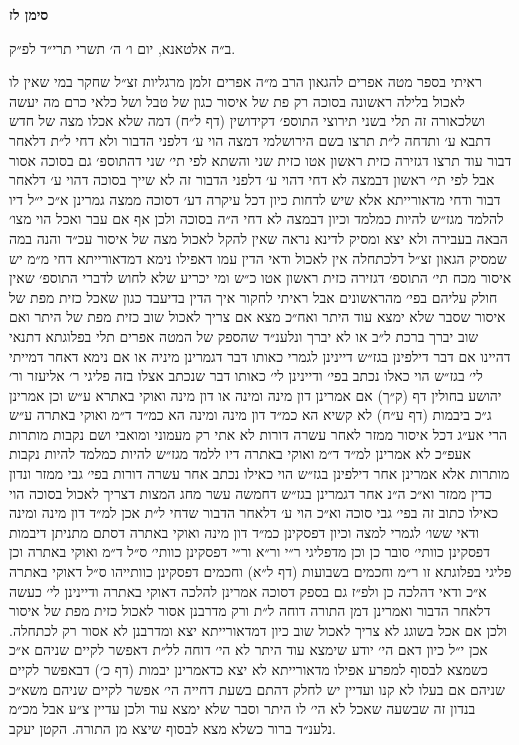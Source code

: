 \documentclass[12pt, openany]{book}
\newcommand{\chapname}{}
\newcommand{\newchap}[1]{
	\addcontentsline{toc}{chapter}{#1}
	\renewcommand{\chapname}{#1}
		\begin{center}
			\textbf{%
\fontsize{16pt}{16pt}\selectfont
				#1}
		\end{center}
}
\begin{document}
\newchap{סימן לז}
\begin{multicols}{2}
ב״ה אלטאנא, יום ו׳ ה׳ תשרי תרי״ד לפ״ק.\\\vspace{0pt}

ראיתי בספר מטה אפרים להגאון הרב מ״ה אפרים זלמן מרגליות זצ״ל שחקר במי שאין לו לאכול בלילה ראשונה בסוכה רק פת של איסור כגון של טבל ושל כלאי כרם מה יעשה ושלכאורה זה תלי בשני תירוצי התוספ׳ דקידושין (דף ל״ח) דמה שלא אכלו מצה של חדש דתבא ע׳ ותדחה ל״ת תרצו בשם הירושלמי דמצה הוי ע׳ דלפני הדבור ולא דחי ל״ת דלאחר דבור עוד תרצו דגזירה כזית ראשון אטו כזית שני והשתא לפי תי׳ שני דהתוספ׳ גם בסוכה אסור אבל לפי תי׳ ראשון דבמצה לא דחי דהוי ע׳ דלפני הדבור זה לא שייך בסוכה דהוי ע׳ דלאחר דבור ודחי מדאורייתא אלא שיש לדחות כיון דכל עיקרה דע׳ דסוכה ממצה גמרינן א״כ י״ל דיו להלמד מגז״ש להיות כמלמד וכיון דבמצה לא דחי ה״ה בסוכה ולכן אף אם עבר ואכל הוי מצו׳ הבאה בעבירה ולא יצא ומסיק לדינא נראה שאין להקל לאכול מצה של איסור עכ״ד והנה במה שמסיק הגאון זצ״ל דלכתחלה אין לאכול ודאי הדין עמו דאפילו נימא דמדאורייתא דחי מ״מ יש איסור מכח תי׳ התוספ׳ דגזירה כזית ראשון אטו כ״ש ומי יכריע שלא לחוש לדברי התוספ׳ שאין חולק עליהם בפי׳ מהראשונים אבל ראיתי לחקור איך הדין בדיעבד כגון שאכל כזית מפת של איסור שסבר שלא ימצא עוד היתר ואח״כ מצא אם צריך לאכול שוב כזית מפת של היתר ואם שוב יברך ברכת ל״ב או לא יברך ונלענ״ד שהספק של המטה אפרים תלי בפלוגתא דתנאי דהיינו אם דבר דילפינן בגז״ש דיינינן לגמרי כאותו דבר דגמרינן מיניה או אם נימא דאחר דמייתי לי׳ בגז״ש הוי כאלו נכתב בפי׳ ודיינינן לי׳ כאותו דבר שנכתב אצלו בזה פליגי ר׳ אליעזר ור׳ יהושע בחולין דף (ק״ך) אם אמרינן דון מינה ומינה או דון מינה ואוקי באתרא ע״ש וכן אמרינן ג״כ ביבמות (דף ע״ח) לא קשיא הא כמ״ד דון מינה ומינה הא כמ״ד ד״מ ואוקי באתרה ע״ש הרי אע״ג דכל איסור ממזר לאחר עשרה דורות לא אתי רק מעמוני ומואבי ושם נקבות מותרות אעפ״כ לא אמרינן למ״ד ד״מ ואוקי באתרה דיו ללמד מגז״ש להיות כמלמד להיות נקבות מותרות אלא אמרינן אחר דילפינן בגז״ש הוי כאילו נכתב אחר עשרה דורות בפי׳ גבי ממזר ונדון כדין ממזר וא״כ ה״נ אחר דגמרינן בגז״ש דחמשה עשר מחג המצות דצריך לאכול בסוכה הוי כאילו כתוב זה בפי׳ גבי סוכה וא״כ הוי ע׳ דלאחר הדבור שדחי ל״ת אכן למ״ד דון מינה ומינה ודאי ששו׳ לגמרי למצה וכיון דפסקינן כמ״ד דון מינה ואוקי באתרה דסתם מתניתן דיבמות דפסקינן כוותי׳ סובר כן וכן מדפליגי ר״י ור״א ור״י דפסקינן כוותי׳ ס״ל ד״מ ואוקי באתרה וכן פליגי בפלוגתא זו ר״מ וחכמים בשבועות (דף ל״א) וחכמים דפסקינן כוותייהו ס״ל דאוקי באתרה א״כ ודאי דהלכה כן ולפ״ז גם בספק דסוכה אמרינן להלכה דאוקי באתרה ודיינינן לי׳ כעשה דלאחר הדבור ואמרינן דמן התורה דוחה ל״ת ורק מדרבנן אסור לאכול כזית מפת של איסור ולכן אם אכל בשוגג לא צריך לאכול שוב כיון דמדאורייתא יצא ומדרבנן לא אסור רק לכתחלה. אכן י״ל כיון דאם הי׳ יודע שימצא עוד היתר לא הי׳ דוחה לל״ת דאפשר לקיים שניהם א״כ כשמצא לבסוף למפרע אפילו מדאורייתא לא יצא כדאמרינן יבמות (דף כ׳) דבאפשר לקיים שניהם אם בעלו לא קנו ועדיין יש לחלק דהתם בשעת דחייה הי׳ אפשר לקיים שניהם משא״כ בנדון זה שבשעה שאכל לא הי׳ לו היתר וסבר שלא ימצא עוד ולכן עדיין צ״ע אבל מכ״מ נלענ״ד ברור כשלא מצא לבסוף שיצא מן התורה. הקטן יעקב.\\\vspace{0pt}

\end{multicols}\newpage
\end{document}
